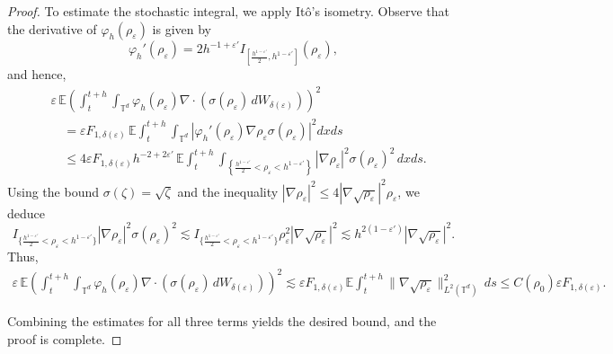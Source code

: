 \documentclass[UTF-8,reqno]{amsart}
\numberwithin{equation}{section}
\def\leq{\leqslant}
\def\leq{\leqslant}
\begin{document}
\begin{proof}
To estimate the stochastic integral, we apply It\^o's isometry. Observe that the derivative of $\varphi_h(\rho_{\varepsilon})$ is given by
$$
\varphi_h'(\rho_{\varepsilon}) = 2 h^{-1 + \varepsilon'} I_{\left[\frac{h^{1 - \varepsilon'}}{2}, h^{1 - \varepsilon'}\right]}(\rho_{\varepsilon}),
$$
and hence,
\begin{align*}
&\varepsilon \, \mathbb{E} \left( \int_t^{t + h} \int_{\mathbb{T}^d} \varphi_h(\rho_{\varepsilon}) \nabla \cdot (\sigma(\rho_{\varepsilon}) \, dW_{\delta(\varepsilon)}) \right)^2 \\
&\quad= \varepsilon F_{1,\delta(\varepsilon)} \, \mathbb{E} \int_t^{t + h} \int_{\mathbb{T}^d} \left| \varphi_h'(\rho_{\varepsilon}) \nabla \rho_{\varepsilon} \sigma(\rho_{\varepsilon}) \right|^2 dx ds \\
&\quad\leq 4 \varepsilon F_{1,\delta(\varepsilon)} h^{-2 + 2\varepsilon'} \, \mathbb{E} \int_t^{t + h} \int_{\left\{ \frac{h^{1 - \varepsilon'}}{2} < \rho_{\varepsilon} < h^{1 - \varepsilon'} \right\}} |\nabla \rho_{\varepsilon}|^2 \sigma(\rho_{\varepsilon})^2 \, dx ds.
\end{align*}
Using the bound $\sigma(\zeta) = \sqrt{\zeta}$ and the inequality $|\nabla \rho_{\varepsilon}|^2 \leq 4 |\nabla \sqrt{\rho_{\varepsilon}}|^2 \rho_{\varepsilon}$, we deduce
$$
I_{\{\frac{h^{1-\varepsilon'}}{2}<\rho_{\varepsilon}<h^{1-\varepsilon'}\}}|\nabla \rho_{\varepsilon}|^2 \sigma(\rho_{\varepsilon})^2 \lesssim I_{\{\frac{h^{1-\varepsilon'}}{2}<\rho_{\varepsilon}<h^{1-\varepsilon'}\}}\rho_{\varepsilon}^2 |\nabla \sqrt{\rho_{\varepsilon}}|^2 \lesssim h^{2(1 - \varepsilon')} |\nabla \sqrt{\rho_{\varepsilon}}|^2.
$$
Thus,
\begin{align*}
\varepsilon \, \mathbb{E} \left( \int_t^{t + h} \int_{\mathbb{T}^d} \varphi_h(\rho_{\varepsilon}) \nabla \cdot (\sigma(\rho_{\varepsilon}) \, dW_{\delta(\varepsilon)}) \right)^2 
\lesssim \varepsilon F_{1,\delta(\varepsilon)}\mathbb{E} \int_t^{t + h} \|\nabla \sqrt{\rho_{\varepsilon}}\|_{L^2(\mathbb{T}^d)}^2 \, ds \leq C(\rho_0)\varepsilon F_{1,\delta(\varepsilon)}.
\end{align*}

Combining the estimates for all three terms yields the desired bound, and the proof is complete.
\end{proof}
\end{document}
